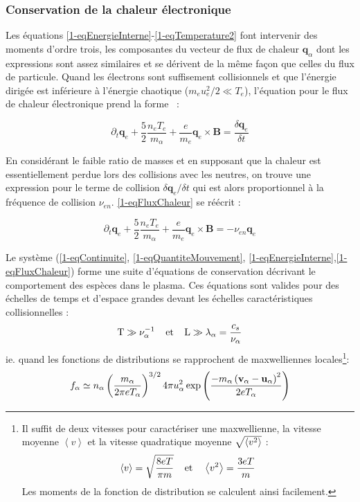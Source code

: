 \begin{refsection}
\subsubsection{Conservation de la chaleur électronique}

Les équations \eqref{1-eqEnergieInterne}-\eqref{1-eqTemperature2} font
intervenir des moments d'ordre trois, les composantes du vecteur de flux de
chaleur $\mathbf q_\alpha$ dont les expressions sont assez similaires et se
dérivent de la même façon que celles du flux de particule. Quand les électrons
sont suffisement collisionnels et que l'énergie dirigée est inférieure à
l'énergie chaotique ($m_eu_e^2/2\ll T_e$), l'équation pour le flux de chaleur
électronique prend la forme~\parencite{Golant} :

\begin{equation}
\label{1-eqFluxChaleur}
\partial_t\mathbf
q_e+\frac{5}{2}\frac{n_e
T_e}{m_\alpha}+\frac{e}{m_e} \mathbf q_e\times\mathbf
B=\frac{\delta\mathbf q_e}{\delta t}
\end{equation}


En considérant le faible ratio de
masses et en supposant que la chaleur est essentiellement perdue lors des
collisions avec les neutres, on trouve une expression pour le terme de collision  $\delta\mathbf q_e/\delta
t$ qui est alors
proportionnel à la fréquence de collision $\nu_{en}$. \eqref{1-eqFluxChaleur} se
réécrit :

\begin{equation}
\label{1-eqFluxChaleur2}
\partial_t\mathbf
q_e+\frac{5}{2}\frac{n_e
T_e}{m_\alpha}+\frac{e}{m_e} \mathbf q_e\times\mathbf
B=-\nu_{en}\mathbf q_e
\end{equation}

Le système (\eqref{1-eqContinuite}, \eqref{1-eqQuantiteMouvement},
\eqref{1-eqEnergieInterne},\eqref{1-eqFluxChaleur}) forme une suite d'équations
de conservation décrivant le comportement des espèces dans le plasma.
Ces équations sont valides pour des échelles de temps et d'espace grandes devant
les échelles caractéristiques collisionnelles :
\begin{equation}
\text{T}\gg \nu_{\alpha}^{{-1}}
\;\;\;\;\text{et}\;\;\;\;\text{L}\gg\lambda_\alpha=\frac{c_s}{\nu_\alpha}
\end{equation}
ie. quand les fonctions de distributions se
rapprochent de maxwelliennes locales\footnote{Il suffit de deux vitesses pour caractériser
une maxwellienne, la vitesse moyenne $\left<v\right>$ et la vitesse quadratique moyenne
$\sqrt{\left<v^{{2}}\right>}$ :
$$
	\left<v\right>=\sqrt{\frac{8eT}{\pi m}} \;\;\;\;\text{et}\;\;\;\; 
	\left<v^{{2}}\right>=\frac{3eT}{m}
$$ Les moments de la fonction de distribution se calculent ainsi facilement.}:
\begin{equation}
\label{1-MaxwellDistribution}
	f_\alpha\simeq n_\alpha
	\left(\frac{m_\alpha}{2\pi
	eT_\alpha}\right)^{{3/2}}4\pi
	u_\alpha^{{2}}\exp\left(\frac{-m_\alpha \left(\mathbf
	v_\alpha-\mathbf u_\alpha\right)^{{2}}}{2eT_\alpha}\right)
\end{equation}


\end{refsection}
